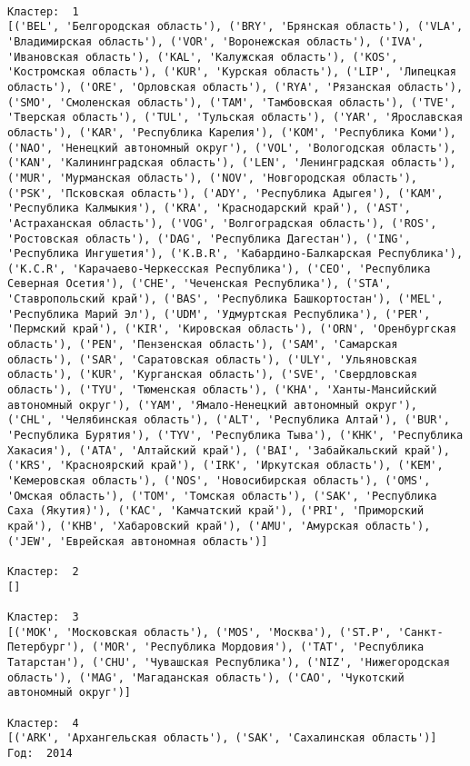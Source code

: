 \documentclass[11pt]{article}
\begin{document}
    \begin{Verbatim}[commandchars=\\\{\}]

Кластер:  1
[('BEL', 'Белгородская область'), ('BRY', 'Брянская область'), ('VLA', 'Владимирская область'), ('VOR', 'Воронежская область'), ('IVA', 'Ивановская область'), ('KAL', 'Калужская область'), ('KOS', 'Костромская область'), ('KUR', 'Курская область'), ('LIP', 'Липецкая область'), ('ORE', 'Орловская область'), ('RYA', 'Рязанская область'), ('SMO', 'Смоленская область'), ('TAM', 'Тамбовская область'), ('TVE', 'Тверская область'), ('TUL', 'Тульская область'), ('YAR', 'Ярославская область'), ('KAR', 'Республика Карелия'), ('KOM', 'Республика Коми'), ('NAO', 'Ненецкий автономный округ'), ('VOL', 'Вологодская область'), ('KAN', 'Калинингpадская область'), ('LEN', 'Ленинградская область'), ('MUR', 'Мурманская область'), ('NOV', 'Новгородская область'), ('PSK', 'Псковская область'), ('ADY', 'Республика Адыгея'), ('KAM', 'Республика Калмыкия'), ('KRA', 'Краснодарский край'), ('AST', 'Астраханская область'), ('VOG', 'Волгоградская область'), ('ROS', 'Ростовская область'), ('DAG', 'Республика Дагестан'), ('ING', 'Республика Ингушетия'), ('K.B.R', 'Кабардино-Балкарская Республика'), ('K.C.R', 'Карачаево-Черкесская Республика'), ('CEO', 'Республика Северная Осетия'), ('CHE', 'Чеченская Республика'), ('STA', 'Ставропольский край'), ('BAS', 'Республика Башкортостан'), ('MEL', 'Республика Марий Эл'), ('UDM', 'Удмуртская Республика'), ('PER', 'Пермский край'), ('KIR', 'Кировская область'), ('ORN', 'Оренбургская область'), ('PEN', 'Пензенская область'), ('SAM', 'Самарская область'), ('SAR', 'Саратовская область'), ('ULY', 'Ульяновская область'), ('KUR', 'Курганская область'), ('SVE', 'Свердловская область'), ('TYU', 'Тюменская область'), ('KHA', 'Ханты-Мансийский автономный округ'), ('YAM', 'Ямало-Ненецкий автономный округ'), ('CHL', 'Челябинская область'), ('ALT', 'Республика Алтай'), ('BUR', 'Республика Бурятия'), ('TYV', 'Республика Тыва'), ('KHK', 'Республика Хакасия'), ('ATA', 'Алтайский край'), ('BAI', 'Забайкальский край'), ('KRS', 'Красноярский край'), ('IRK', 'Иркутская область'), ('KEM', 'Кемеровская область'), ('NOS', 'Новосибирская область'), ('OMS', 'Омская область'), ('TOM', 'Томская область'), ('SAK', 'Республика Саха (Якутия)'), ('KAC', 'Камчатский край'), ('PRI', 'Приморский край'), ('KHB', 'Хабаровский край'), ('AMU', 'Амурская область'), ('JEW', 'Еврейская автономная область')]

Кластер:  2
[]

Кластер:  3
[('MOK', 'Московская область'), ('MOS', 'Москва'), ('ST.P', 'Санкт-Петербург'), ('MOR', 'Республика Мордовия'), ('TAT', 'Республика Татарстан'), ('CHU', 'Чувашская Республика'), ('NIZ', 'Нижегородская область'), ('MAG', 'Магаданская область'), ('CAO', 'Чукотский автономный округ')]

Кластер:  4
[('ARK', 'Архангельская область'), ('SAK', 'Сахалинская область')]
Год:  2014

    \end{Verbatim}
\end{document}
